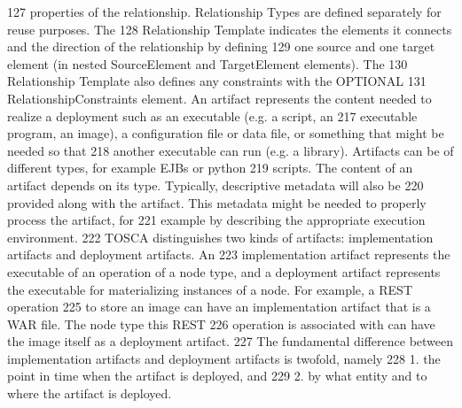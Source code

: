 127 properties of the relationship. Relationship Types are defined separately for reuse purposes. The
128 Relationship Template indicates the elements it connects and the direction of the relationship by defining
129 one source and one target element (in nested SourceElement and TargetElement elements). The
130 Relationship Template also defines any constraints with the OPTIONAL
131 RelationshipConstraints element. 
An artifact represents the content needed to realize a deployment such as an executable (e.g. a script, an
217 executable program, an image), a configuration file or data file, or something that might be needed so that
218 another executable can run (e.g. a library). Artifacts can be of different types, for example EJBs or python
219 scripts. The content of an artifact depends on its type. Typically, descriptive metadata will also be
220 provided along with the artifact. This metadata might be needed to properly process the artifact, for
221 example by describing the appropriate execution environment.
222 TOSCA distinguishes two kinds of artifacts: implementation artifacts and deployment artifacts. An
223 implementation artifact represents the executable of an operation of a node type, and a deployment 
artifact represents the executable for materializing instances of a node. For example, a REST operation
225 to store an image can have an implementation artifact that is a WAR file. The node type this REST
226 operation is associated with can have the image itself as a deployment artifact.
227 The fundamental difference between implementation artifacts and deployment artifacts is twofold, namely
228 1. the point in time when the artifact is deployed, and
229 2. by what entity and to where the artifact is deployed.

